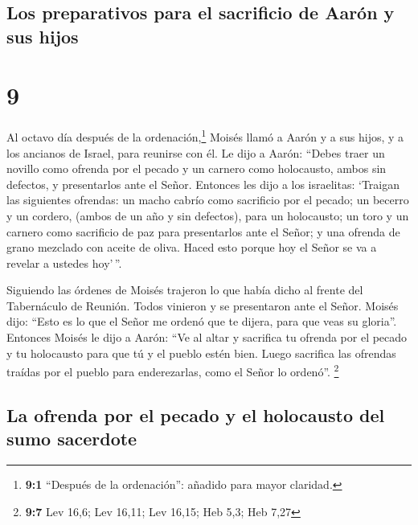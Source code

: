 \hypertarget{los-preparativos-para-el-sacrificio-de-aaruxf3n-y-sus-hijos}{%
\subsection{Los preparativos para el sacrificio de Aarón y sus
hijos}\label{los-preparativos-para-el-sacrificio-de-aaruxf3n-y-sus-hijos}}

\hypertarget{section-8}{%
\section{9}\label{section-8}}

 Al octavo día después de la ordenación,\footnote{\textbf{9:1}
  ``Después de la ordenación'': añadido para mayor claridad.} Moisés
llamó a Aarón y a sus hijos, y a los ancianos de Israel, para reunirse
con él.  Le dijo a Aarón: ``Debes traer un novillo como
ofrenda por el pecado y un carnero como holocausto, ambos sin defectos,
y presentarlos ante el Señor.  Entonces les dijo a los
israelitas: `Traigan las siguientes ofrendas: un macho cabrío como
sacrificio por el pecado; un becerro y un cordero, (ambos de un año y
sin defectos), para un holocausto;  un toro y un carnero
como sacrificio de paz para presentarlos ante el Señor; y una ofrenda de
grano mezclado con aceite de oliva. Haced esto porque hoy el Señor se va
a revelar a ustedes hoy'\,''.

 Siguiendo las órdenes de Moisés trajeron lo que había
dicho al frente del Tabernáculo de Reunión. Todos vinieron y se
presentaron ante el Señor.  Moisés dijo: ``Esto es lo que
el Señor me ordenó que te dijera, para que veas su gloria''.
 Entonces Moisés le dijo a Aarón: ``Ve al altar y
sacrifica tu ofrenda por el pecado y tu holocausto para que tú y el
pueblo estén bien. Luego sacrifica las ofrendas traídas por el pueblo
para enderezarlas, como el Señor lo ordenó''. \footnote{\textbf{9:7} Lev
  16,6; Lev 16,11; Lev 16,15; Heb 5,3; Heb 7,27}

\hypertarget{la-ofrenda-por-el-pecado-y-el-holocausto-del-sumo-sacerdote}{%
\subsection{La ofrenda por el pecado y el holocausto del sumo
sacerdote}\label{la-ofrenda-por-el-pecado-y-el-holocausto-del-sumo-sacerdote}}


